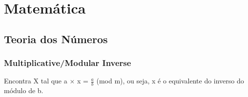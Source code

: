 \section{Matemática}

\subsection{Teoria dos Números}


\subsubsection{Multiplicative/Modular Inverse}
Encontra X tal que a $\times$ x = $\frac{a}{b}$ (mod m), ou seja, x é o equivalente do inverso do módulo de b.
\divisor
